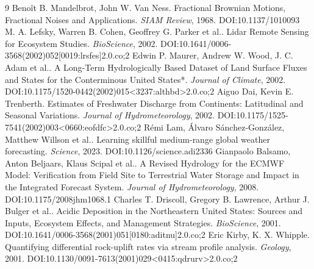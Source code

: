 \documentclass[11pt]{article}
\begin{document}
\begin{thebibliography}{9}
 Benoît B. Mandelbrot, John W. Van Ness. Fractional Brownian Motions, Fractional Noises and Applications. \emph{SIAM Review}, 1968. DOI:10.1137/1010093
 M. A. Lefsky, Warren B. Cohen, Geoffrey G. Parker et al.. Lidar Remote Sensing for Ecosystem Studies. \emph{BioScience}, 2002. DOI:10.1641/0006-3568(2002)052[0019:lrsfes]2.0.co;2
 Edwin P. Maurer, Andrew W. Wood, J. C. Adam et al.. A Long-Term Hydrologically Based Dataset of Land Surface Fluxes and States for the Conterminous United States*. \emph{Journal of Climate}, 2002. DOI:10.1175/1520-0442(2002)015<3237:althbd>2.0.co;2
 Aiguo Dai, Kevin E. Trenberth. Estimates of Freshwater Discharge from Continents: Latitudinal and Seasonal Variations. \emph{Journal of Hydrometeorology}, 2002. DOI:10.1175/1525-7541(2002)003<0660:eofdfc>2.0.co;2
 Rémi Lam, Álvaro Sánchez‐González, Matthew Willson et al.. Learning skillful medium-range global weather forecasting. \emph{Science}, 2023. DOI:10.1126/science.adi2336
 Gianpaolo Balsamo, Anton Beljaars, Klaus Scipal et al.. A Revised Hydrology for the ECMWF Model: Verification from Field Site to Terrestrial Water Storage and Impact in the Integrated Forecast System. \emph{Journal of Hydrometeorology}, 2008. DOI:10.1175/2008jhm1068.1
 Charles T. Driscoll, Gregory B. Lawrence, Arthur J. Bulger et al.. Acidic Deposition in the Northeastern United States: Sources and Inputs, Ecosystem Effects, and Management Strategies. \emph{BioScience}, 2001. DOI:10.1641/0006-3568(2001)051[0180:aditnu]2.0.co;2
 Eric Kirby, K. X. Whipple. Quantifying differential rock-uplift rates via stream profile analysis. \emph{Geology}, 2001. DOI:10.1130/0091-7613(2001)029<0415:qdrurv>2.0.co;2
\end{thebibliography}
\end{document}
